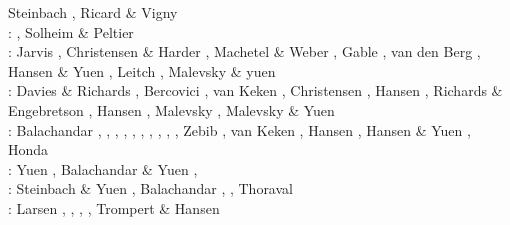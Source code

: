 \begin{scriptsize}
                     Steinbach \etal \cite{sthe89}, Ricard \& Vigny \cite{rivi89}\\
\nineteenninety: \cite{trab90}\cite{gurn90}\cite{ketu90}, Solheim \& Peltier \cite{sope90}\\
\nineteenninetyone: Jarvis \cite{jarv91}, Christensen \& Harder \cite{chha91},
                    Machetel \& Weber \cite{mawe91}, Gable \etal \cite{gaot91},
                    van den Berg \etal \cite{vayv91}, Hansen \& Yuen \cite{hayk91},
                    Leitch \etal \cite{leys91} , Malevsky \& yuen \cite{mayu91}\\
\nineteenninetytwo: Davies \& Richards \cite{dari92}, Bercovici \etal \cite{besg92},
                    van Keken \etal{} \cite{vayv92},
                    Christensen \cite{chri92}, Hansen \etal \cite{haym92}, 
                    Richards \& Engebretson \cite{rien92}, Hansen \etal \cite{hayk92},
                    Malevsky \etal \cite{mayw92}, Malevsky \& Yuen \cite{mayu92} \\
\nineteenninetythree: Balachandar \etal \cite{bayr93}, \cite{zhch93},
                      \cite{jarv93}, \cite{tack93},
                      \cite{bucc93}, \cite{carm93},
                      \cite{vavy93}, \cite{tasg93},
                      \cite{zhgu93}, \cite{mamc93},
                      Zebib \cite{zebi93}, van Keken \etal \cite{vayv93}, 
                      Hansen \etal \cite{hayk93}, Hansen \& Yuen \cite{hayu93},
                      Honda \etal \cite{hoyb93,hoby93}\\
\nineteenninetyfour: Yuen \etal \cite{yurb94}, Balachandar \& Yuen \cite{bayu94}, \cite{haeb94}
                     \cite{chho94}\cite{tasg94}\cite{itki94}\cite{leka94}\cite{scha94}\\
\nineteenninetyfive: Steinbach \& Yuen \cite{styu95}, Balachandar \etal \cite{bayr95,bayr95b}, 
                     \cite{zhgu95}
                     \cite{vayv95}\cite{buba95}\cite{rasz95}\cite{berc95}\cite{puhj95}\cite{pujh95}
      \cite{solo95}\cite{vayu95}\cite{matb95}, Thoraval \etal \cite{thmc95}\\
\nineteenninetysix: Larsen \etal \cite{laym96}, \cite{zhyu96},
                    \cite{hond96}\cite{rytr96a}
                    \cite{rytr96b}\cite{tack96}
                    \cite{trbo96}, \cite{birg96}
                    \cite{burb96}\cite{kafo96}
                    \cite{guez96}\cite{vayu96}
                    \cite{rasz96}\cite{rasz96b}
                    \cite{leka96}\cite{iwas96}
                    \cite{buri96}\cite{schh96}, Trompert \& Hansen \cite{trha96}\\

\end{scriptsize}
